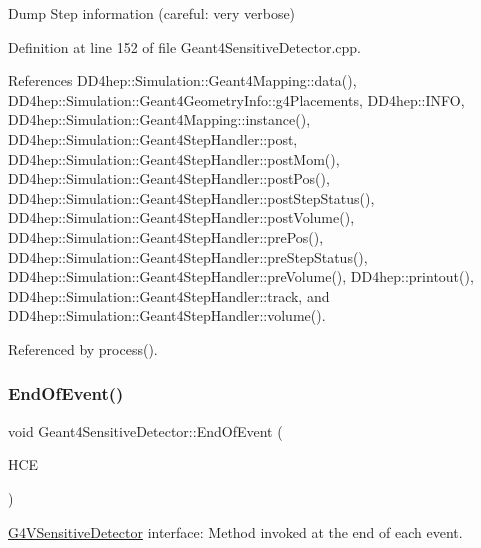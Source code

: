 Dump Step information (careful\+: very verbose) 



Definition at line 152 of file Geant4\+Sensitive\+Detector.\+cpp.



References D\+D4hep\+::\+Simulation\+::\+Geant4\+Mapping\+::data(), D\+D4hep\+::\+Simulation\+::\+Geant4\+Geometry\+Info\+::g4\+Placements, D\+D4hep\+::\+I\+N\+FO, D\+D4hep\+::\+Simulation\+::\+Geant4\+Mapping\+::instance(), D\+D4hep\+::\+Simulation\+::\+Geant4\+Step\+Handler\+::post, D\+D4hep\+::\+Simulation\+::\+Geant4\+Step\+Handler\+::post\+Mom(), D\+D4hep\+::\+Simulation\+::\+Geant4\+Step\+Handler\+::post\+Pos(), D\+D4hep\+::\+Simulation\+::\+Geant4\+Step\+Handler\+::post\+Step\+Status(), D\+D4hep\+::\+Simulation\+::\+Geant4\+Step\+Handler\+::post\+Volume(), D\+D4hep\+::\+Simulation\+::\+Geant4\+Step\+Handler\+::pre\+Pos(), D\+D4hep\+::\+Simulation\+::\+Geant4\+Step\+Handler\+::pre\+Step\+Status(), D\+D4hep\+::\+Simulation\+::\+Geant4\+Step\+Handler\+::pre\+Volume(), D\+D4hep\+::printout(), D\+D4hep\+::\+Simulation\+::\+Geant4\+Step\+Handler\+::track, and D\+D4hep\+::\+Simulation\+::\+Geant4\+Step\+Handler\+::volume().



Referenced by process().

\hypertarget{class_d_d4hep_1_1_simulation_1_1_geant4_sensitive_detector_a1275a33abdbd4efb70ee1698eda3d2db}{}\label{class_d_d4hep_1_1_simulation_1_1_geant4_sensitive_detector_a1275a33abdbd4efb70ee1698eda3d2db} 
\subsubsection{\texorpdfstring{End\+Of\+Event()}{EndOfEvent()}}
{\footnotesize\ttfamily void Geant4\+Sensitive\+Detector\+::\+End\+Of\+Event (\begin{DoxyParamCaption}\item[{G4\+H\+Cof\+This\+Event $\ast$}]{H\+CE }\end{DoxyParamCaption})\hspace{0.3cm}{\ttfamily [virtual]}}



\hyperlink{class_g4_v_sensitive_detector}{G4\+V\+Sensitive\+Detector} interface\+: Method invoked at the end of each event. 


